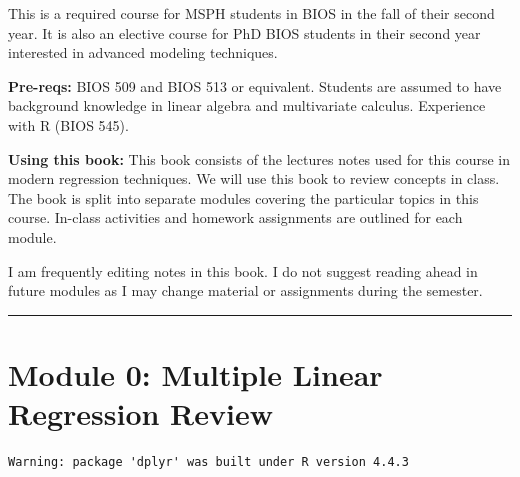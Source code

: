 \documentclass[
  letterpaper,
  DIV=11,
  numbers=noendperiod]{scrreprt}
\begin{document}
This is a required course for MSPH students in BIOS in the fall of their
second year. It is also an elective course for PhD BIOS students in
their second year interested in advanced modeling techniques.

\textbf{Pre-reqs:} BIOS 509 and BIOS 513 or equivalent. Students are
assumed to have background knowledge in linear algebra and multivariate
calculus. Experience with R (BIOS 545).

\textbf{Using this book:} This book consists of the lectures notes used
for this course in modern regression techniques. We will use this book
to review concepts in class. The book is split into separate modules
covering the particular topics in this course. In-class activities and
homework assignments are outlined for each module.

\begin{tcolorbox}[enhanced jigsaw, breakable, colbacktitle=quarto-callout-warning-color!10!white, left=2mm, colframe=quarto-callout-warning-color-frame, opacityback=0, coltitle=black, colback=white, rightrule=.15mm, title={Warning}, titlerule=0mm, opacitybacktitle=0.6, leftrule=.75mm, toprule=.15mm, arc=.35mm, bottomtitle=1mm, toptitle=1mm, bottomrule=.15mm]

I am frequently editing notes in this book. I do not suggest reading
ahead in future modules as I may change material or assignments during
the semester.

\end{tcolorbox}

\begin{center}\rule{0.5\linewidth}{0.5pt}\end{center}


\hypertarget{module-0-multiple-linear-regression-review}{%
\chapter*{Module 0: Multiple Linear Regression
Review}\label{module-0-multiple-linear-regression-review}}


\begin{verbatim}
Warning: package 'dplyr' was built under R version 4.4.3
\end{verbatim}
\end{document}
